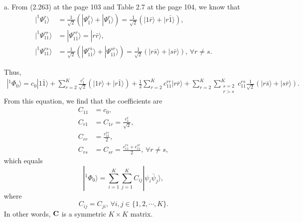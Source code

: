 \documentclass[a4paper]{book}
\newcommand{\C}{{\bf C}}
\begin{document}
	\begin{solution}
	
	\begin{enumerate}
	
	\item[a.] From (2.263) at the page 103 and Table 2.7 at the page 104, we know that	
	\begin{align*}
		| ^1 \Psi^r_1 \rangle &= \frac{ 1 }{ \sqrt{2} } \left( | \Psi^{ \bar{r} }_{ \bar{1} } \rangle + | \Psi^r_1 \rangle \right) = \frac{ 1 }{ \sqrt{2} } \left( | 1 \bar{r} \rangle + | r \bar{1} \rangle \right) , \\
		| ^1 \Psi^{rr}_{11} \rangle &= | \Psi^{r \bar{r}}_{1 \bar{1}} \rangle = | r \bar{r} \rangle , \\
		| ^1 \Psi^{rs}_{11} \rangle &= \frac{ 1 }{ \sqrt{2} } \left( | \Psi^{ r \bar{s} }_{ 1 \bar{1} } \rangle + | \Psi^{s \bar{r} }_{ 1 \bar{1} } \rangle \right) = \frac{ 1 }{ \sqrt{2} } \left( | r \bar{s} \rangle + | s \bar{r} \rangle \right) , \, \forall r \neq s.
	\end{align*}
	
	Thus, 
	\begin{align*}
		| ^1 \Phi_0 \rangle = c_0 | 1 \bar{1} \rangle + \sum_{r=2}^K  \frac{ c^r_1 }{ \sqrt{2} } \left( | 1 \bar{r} \rangle + | r \bar{1} \rangle \right) + \frac{1}{2} \sum_{r=2}^K c^{rr}_{11} | r \bar{r} \rangle + \sum_{r=2}^K \sum_{ \substack{ s=2 \\ r > s } }^K c^{rs}_{11} \frac{ 1 }{ \sqrt{2} } \left( | r \bar{s} \rangle + | s \bar{r} \rangle \right).
	\end{align*}
	From this equation, we find that the coefficients are
	\begin{align*}
		C_{11} &= c_0 , \\
		C_{r1} &= C_{1r} = \frac{ c^r_1 }{ \sqrt{2} }, \\
		C_{rr} &= \frac{ c^{rr}_{11} }{ 2 }, \\
		C_{rs} &= C_{sr} = \frac{ c^{rs}_{11} + c^{sr}_{11} }{ 2 } , \, \forall r \neq s ,
	\end{align*}
	which equals
	\begin{equation}
		|{}^{1}\Phi_0 \rangle = \sum_{i=1}^K \sum_{j=1}^K C_{ij} | \psi_i \bar{\psi}_j \rangle,
	\end{equation}		
	where
	\begin{equation}
		C_{ij} = C_{ji}, \, \forall i, j \in \{ 1,2,\cdots, K \}.
	\end{equation}
	In other words, $\C$ is a symmetric $K \times K$ matrix.
	

\end{enumerate}
\end{solution}
\end{document}
